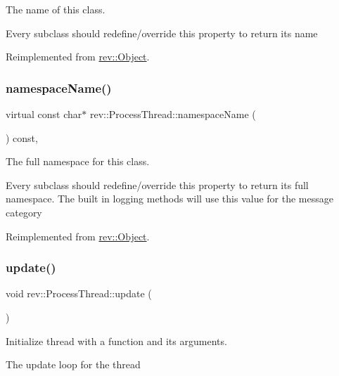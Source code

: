The name of this class. 

Every subclass should redefine/override this property to return its name 

Reimplemented from \mbox{\hyperlink{classrev_1_1_object_a7a2013f91169479b65cf93afdc5d9a68}{rev\+::\+Object}}.

\mbox{\label{classrev_1_1_process_thread_a9a5cd59371fc8c768364dc355b6351d0}} 
\subsubsection{\texorpdfstring{namespaceName()}{namespaceName()}}
{\footnotesize\ttfamily virtual const char$\ast$ rev\+::\+Process\+Thread\+::namespace\+Name (\begin{DoxyParamCaption}{ }\end{DoxyParamCaption}) const\hspace{0.3cm}{\ttfamily [inline]}, {\ttfamily [virtual]}}



The full namespace for this class. 

Every subclass should redefine/override this property to return its full namespace. The built in logging methods will use this value for the message category 

Reimplemented from \mbox{\hyperlink{classrev_1_1_object_aaeb638d3e10f361c56c211a318a27f3d}{rev\+::\+Object}}.

\mbox{\label{classrev_1_1_process_thread_a24e0793126ea3c5935c62a3034dbdca1}} 
\subsubsection{\texorpdfstring{update()}{update()}}
{\footnotesize\ttfamily void rev\+::\+Process\+Thread\+::update (\begin{DoxyParamCaption}{ }\end{DoxyParamCaption})}



Initialize thread with a function and its arguments. 

The update loop for the thread 

